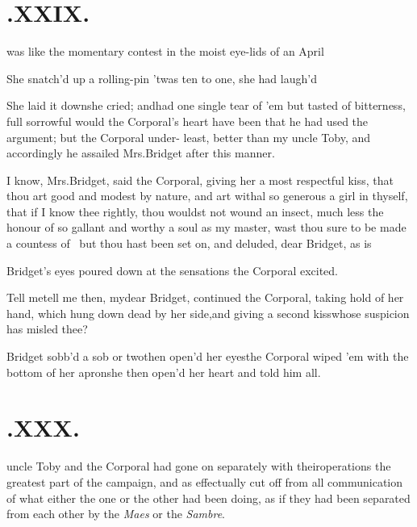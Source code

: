 \documentclass{article}
\begin{document}
\vfill{}\eject
\null{}\baselineskip
\section{.\enspace XXIX.}

 was like the momentary contest in
the moist eye-lids of an April\break
{} 

She snatch’d up a rolling-pin\tsh\break
’twas ten to one, she had laugh’d\tsh

She laid it down\tsh she cried; and\break had one single tear
of ’em but tasted of bitterness, full sorrowful would the
Corporal’s heart have been that he had used the
argument; but the Corporal under-
least, better than my uncle Toby, and\break
accordingly he assailed Mrs.\@ Bridget after this
manner.

I know, Mrs.\@ Bridget, said the Corporal, giving her a
most respectful kiss, that thou art good and modest by nature, and
art withal so generous a girl in thyself, that if I know thee
rightly, thou wouldst not wound an insect, much less the
honour of so gallant and worthy a soul as my master, wast thou sure
to be made a countess of \tsh\ but thou hast been set on,
and deluded, dear Bridget, as is

Bridget’s eyes poured down at the sensations the
Corporal excited.

\tsh Tell me\tsh tell me then, my\break dear
Bridget, continued the Corporal, taking hold of her hand,
which hung down dead by her side,\tsh and giving a second
kiss\tsh whose suspicion has misled thee?

Bridget sobb’d a sob or two\tsh then
open’d her eyes\tsh the Corporal wiped ’em
with the bottom of her apron\tsh\break she then open’d her
heart and told him all.

\vfill{}\eject
\null{}\baselineskip
\section{.\enspace XXX.}

 uncle Toby and the Corporal
had gone on separately with their\break operations the greatest part of
the campaign, and as effectually cut off from all communication of
what either the one or the other had been doing, as if they had
been separated from each other by the \textit{Maes} or the
\textit{Sambre}.
\end{document}
